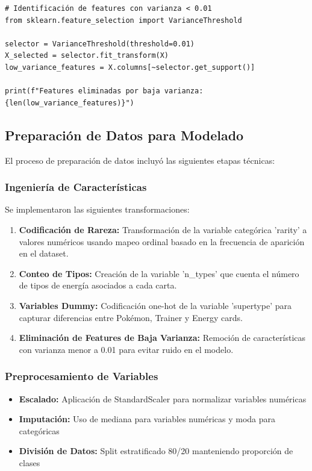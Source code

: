 \documentclass[12pt,letterpaper]{article}
\begin{document}
\begin{verbatim}
# Identificación de features con varianza < 0.01
from sklearn.feature_selection import VarianceThreshold

selector = VarianceThreshold(threshold=0.01)
X_selected = selector.fit_transform(X)
low_variance_features = X.columns[~selector.get_support()]

print(f"Features eliminadas por baja varianza: {len(low_variance_features)}")
\end{verbatim}

\subsection{Preparación de Datos para Modelado}

El proceso de preparación de datos incluyó las siguientes etapas técnicas:

\subsubsection{Ingeniería de Características}

Se implementaron las siguientes transformaciones:

\begin{enumerate}
    \item \textbf{Codificación de Rareza:} Transformación de la variable categórica 'rarity' a valores numéricos usando mapeo ordinal basado en la frecuencia de aparición en el dataset.
    \item \textbf{Conteo de Tipos:} Creación de la variable 'n\_types' que cuenta el número de tipos de energía asociados a cada carta.
    \item \textbf{Variables Dummy:} Codificación one-hot de la variable 'supertype' para capturar diferencias entre Pokémon, Trainer y Energy cards.
    \item \textbf{Eliminación de Features de Baja Varianza:} Remoción de características con varianza menor a 0.01 para evitar ruido en el modelo.
\end{enumerate}

\subsubsection{Preprocesamiento de Variables}

\begin{itemize}
    \item \textbf{Escalado:} Aplicación de StandardScaler para normalizar variables numéricas
    \item \textbf{Imputación:} Uso de mediana para variables numéricas y moda para categóricas
    \item \textbf{División de Datos:} Split estratificado 80/20 manteniendo proporción de clases
\end{itemize}
\end{document}
